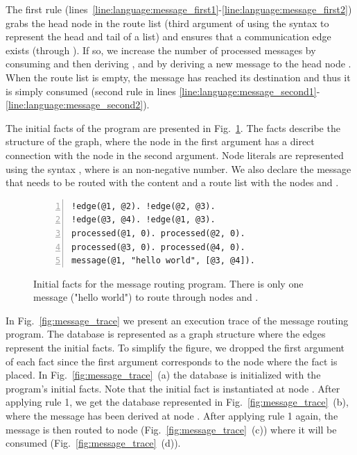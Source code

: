 The first rule
(lines~\ref{line:language:message_first1}-\ref{line:language:message_first2})
grabs the head node  in the route list (third argument of 
using the syntax \code{[B | L]} to represent the head and tail of a list) and
ensures that a communication edge exists (through ). If so, we
increase the number of processed messages by consuming 
and then deriving , and by deriving a new message to
the head node .  When the route list is empty, the message has reached
its destination and thus it is simply consumed (second rule in lines
\ref{line:language:message_second1}-\ref{line:language:message_second2}).

The initial facts of the program are presented in
Fig.~\ref{code:language:message_facts}. The  facts describe the
structure of the graph, where the node in the first argument has a direct
connection with the node in the second argument. Node literals are represented
using the syntax , where  is an non-negative number. We also
declare the message that needs to be routed with the content  and a route list with the nodes  and .

\begin{figure}[h!]
\begin{Verbatim}[numbers=left,commandchars=\*\{\},fontsize=\codesize]
!edge(@1, @2). !edge(@2, @3).
!edge(@3, @4). !edge(@1, @3).
processed(@1, 0). processed(@2, 0).
processed(@3, 0). processed(@4, 0).
message(@1, "hello world", [@3, @4]).
\end{Verbatim}
\caption{Initial facts for the message routing program. There is only one message ("hello
world") to route through nodes  and .}
\label{code:language:message_facts}
\end{figure}

In Fig.~\ref{fig:message_trace} we present an execution trace of the message
routing program. The database is represented as a graph structure where the
edges represent the  initial facts. To simplify the figure, we
dropped the first argument of each fact since the first argument corresponds to
the node where the fact is placed. In Fig.~\ref{fig:message_trace}~(a) the
database is initialized with the program's initial facts. Note that the initial
 fact is instantiated at node . After applying rule 1, we
get the database represented in Fig.~\ref{fig:message_trace}~(b), where the
message has been derived at node . After applying rule 1 again, the
message is then routed to node  (Fig.~\ref{fig:message_trace}~(c))
where it will be consumed (Fig.~\ref{fig:message_trace}~(d)).


